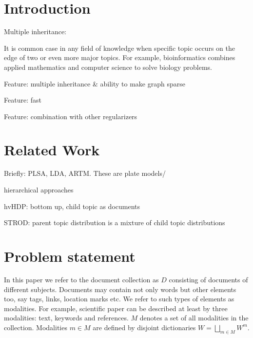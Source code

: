 \documentclass[12pt, twoside]{article}
\begin{document}

\maketitle
\linenumbers

\newcommand{\norm}{\mathop{\text{norm}}}

\section{Introduction}
\noindent %
Multiple inheritance:

It is common case in any field of knowledge when specific topic occurs on the edge of two or even more major topics. For example, bioinformatics combines applied mathematics and computer science to solve biology problems. 

Feature: multiple inheritance \& ability to make graph sparse

Feature: fast

Feature: combination with other regularizers

\section{Related Work}
Briefly: PLSA, LDA, ARTM. These are plate models/

hierarchical approaches

hvHDP: bottom up, child topic as documents

STROD: parent topic distribution is a mixture of child topic distributions



\section{Problem statement}
In this paper we refer to the document collection as $D$ consisting of documents of different subjects.
Documents may contain not only words but other elements too, say tags, links, location marks etc. We refer to such types of elements as modalities. For example, scientific paper can be described at least by three modalities: text, keywords and references. $M$ denotes a set of all modalities in the collection. Modalities $m \in M$ are defined by disjoint dictionaries $W = \bigsqcup_{m \in M} W^m$. 
\end{document}
